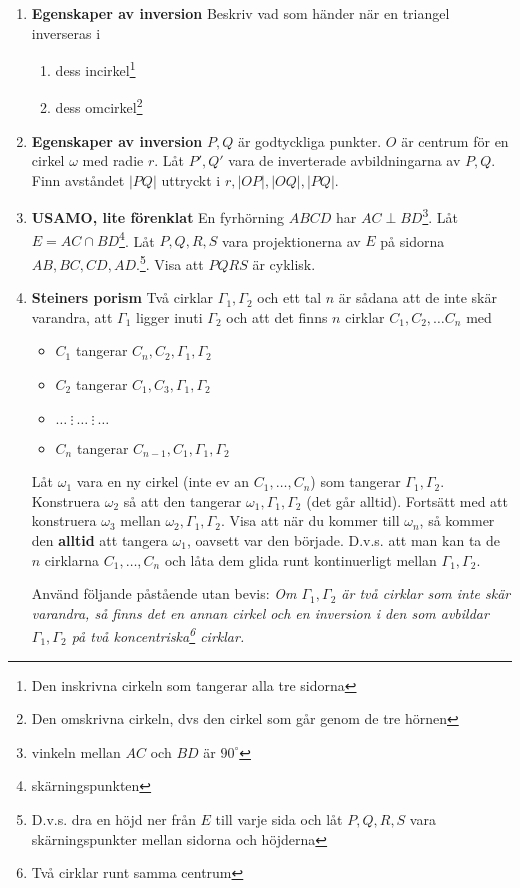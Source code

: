 

	

\begin{enumerate}

\item \textbf{Egenskaper av inversion} Beskriv vad som händer när en triangel inverseras i \begin{enumerate}
	\item dess incirkel\footnote{Den inskrivna cirkeln som tangerar alla tre sidorna}
	\item dess omcirkel\footnote{Den omskrivna cirkeln, dvs den cirkel som går genom de tre hörnen}
	\end{enumerate}

\item \textbf{Egenskaper av inversion} $P,Q$ är godtyckliga punkter. $O$ är centrum för en cirkel $\omega$ med radie $r$. Låt $P',Q'$ vara 
	de inverterade avbildningarna av $P,Q$. Finn avståndet $|PQ|$ uttryckt i $r, |OP|, |OQ|, |PQ|$.

\item \textbf{USAMO, lite förenklat} En fyrhörning $ABCD$ har $AC \perp BD$\footnote{vinkeln mellan $AC$ och $BD$ är $90^\circ$}. Låt 
	$E=AC\cap BD$\footnote{skärningspunkten}. Låt $P,Q,R,S$ vara projektionerna av $E$ på sidorna $AB, BC, CD, AD$.\footnote{D.v.s. 
	dra en höjd ner från $E$ till varje sida och låt $P,Q,R,S$ vara skärningspunkter mellan sidorna och höjderna}.
	Visa att $PQRS$ är cyklisk.

\item \textbf{Steiners porism}
	Två cirklar $\Gamma_1, \Gamma_2$ och ett tal $n$ 
	är sådana att de inte skär varandra, att $\Gamma_1$ ligger inuti $\Gamma_2$ och 
	att det finns $n$ cirklar $C_1, C_2, \ldots C_n$ med 
	\begin{itemize}
	\item $C_1$ tangerar $C_{n}, C_{2}, \Gamma_1, \Gamma_2$
	\item $C_2$ tangerar $C_{1}, C_{3}, \Gamma_1, \Gamma_2$
	\item $\ldots \ \vdots \ \ldots\ \vdots\ \ldots$
	\item $C_n$ tangerar $C_{n-1}, C_{1}, \Gamma_1, \Gamma_2$
	\end{itemize}

	\smallLine

	Låt $\omega_1$ vara en ny cirkel (inte ev an $C_1,\ldots, C_n$) som tangerar $\Gamma_1, \Gamma_2$.
	Konstruera $\omega_2$ så att den tangerar $\omega_1, \Gamma_1, \Gamma_2$ (det går alltid).
	Fortsätt med att konstruera $\omega_3$ mellan $\omega_2, \Gamma_1, \Gamma_2$.
	Visa att när du kommer till $\omega_n$, så kommer den \textbf{alltid} att tangera $\omega_1$, oavsett var den började.
	D.v.s. att man kan ta de $n$ cirklarna $C_1,\ldots,C_n$ och låta dem glida runt kontinuerligt mellan $\Gamma_1, \Gamma_2$.

	\smallLine
	Använd följande påstående utan bevis:
	\textit{
	Om $\Gamma_1, \Gamma_2$ är två cirklar som inte skär varandra, så finns det en annan cirkel och en inversion i den
	som avbildar $\Gamma_1, \Gamma_2$ på två koncentriska\footnote{Två cirklar runt samma centrum} cirklar.
	}

\end{enumerate}
